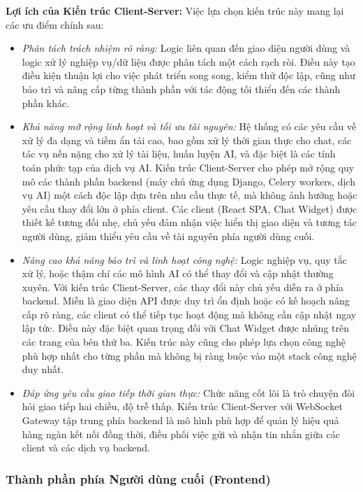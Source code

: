 \textbf{Lợi ích của Kiến trúc Client-Server:} Việc lựa chọn kiến trúc này mang lại các ưu điểm chính sau:
\begin{itemize}
    \item \textit{Phân tách trách nhiệm rõ ràng:} Logic liên quan đến giao diện người dùng và logic xử lý nghiệp vụ/dữ liệu được phân tách một cách rạch ròi. Điều này tạo điều kiện thuận lợi cho việc phát triển song song, kiểm thử độc lập, cũng như bảo trì và nâng cấp từng thành phần với tác động tối thiểu đến các thành phần khác.
    \item \textit{Khả năng mở rộng linh hoạt và tối ưu tài nguyên:} Hệ thống có các yêu cầu về xử lý đa dạng và tiềm ẩn tải cao, bao gồm xử lý thời gian thực cho chat, các tác vụ nền nặng cho xử lý tài liệu, huấn luyện AI, và đặc biệt là các tính toán phức tạp của dịch vụ AI. Kiến trúc Client-Server cho phép mở rộng quy mô các thành phần backend (máy chủ ứng dụng Django, Celery workers, dịch vụ AI) một cách độc lập dựa trên nhu cầu thực tế, mà không ảnh hưởng hoặc yêu cầu thay đổi lớn ở phía client. Các client (React SPA, Chat Widget) được thiết kế tương đối nhẹ, chủ yếu đảm nhận việc hiển thị giao diện và tương tác người dùng, giảm thiểu yêu cầu về tài nguyên phía người dùng cuối.
    \item \textit{Nâng cao khả năng bảo trì và linh hoạt công nghệ:} Logic nghiệp vụ, quy tắc xử lý, hoặc thậm chí các mô hình AI có thể thay đổi và cập nhật thường xuyên. Với kiến trúc Client-Server, các thay đổi này chủ yếu diễn ra ở phía backend. Miễn là giao diện API được duy trì ổn định hoặc có kế hoạch nâng cấp rõ ràng, các client có thể tiếp tục hoạt động mà không cần cập nhật ngay lập tức. Điều này đặc biệt quan trọng đối với Chat Widget được nhúng trên các trang của bên thứ ba. Kiến trúc này cũng cho phép lựa chọn công nghệ phù hợp nhất cho từng phần mà không bị ràng buộc vào một stack công nghệ duy nhất.
    \item \textit{Đáp ứng yêu cầu giao tiếp thời gian thực:} Chức năng cốt lõi là trò chuyện đòi hỏi giao tiếp hai chiều, độ trễ thấp. Kiến trúc Client-Server với WebSocket Gateway tập trung phía backend là mô hình phù hợp để quản lý hiệu quả hàng ngàn kết nối đồng thời, điều phối việc gửi và nhận tin nhắn giữa các client và các dịch vụ backend.
\end{itemize}

\subsubsection{Thành phần phía Người dùng cuối (Frontend)}

